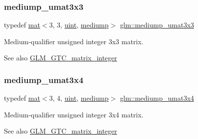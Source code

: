 \subsubsection{\texorpdfstring{mediump\+\_\+umat3x3}{mediump\_umat3x3}}
{\footnotesize\ttfamily typedef \mbox{\hyperlink{structglm_1_1mat}{mat}}$<$3, 3, \mbox{\hyperlink{group__core__precision_ga4fd29415871152bfb5abd588334147c8}{uint}}, \mbox{\hyperlink{namespaceglm_a36ed105b07c7746804d7fdc7cc90ff25a6416f3ea0c9025fb21ed50c4d6620482}{mediump}}$>$ \mbox{\hyperlink{group__gtc__matrix__integer_gac2563a9d45e3f6be0ceaf62b50a983f5}{glm\+::mediump\+\_\+umat3x3}}}

Medium-\/qualifier unsigned integer 3x3 matrix. \begin{DoxySeeAlso}{See also}
\mbox{\hyperlink{group__gtc__matrix__integer}{G\+L\+M\+\_\+\+G\+T\+C\+\_\+matrix\+\_\+integer}} 
\end{DoxySeeAlso}
\mbox{\label{group__gtc__matrix__integer_ga22e32b4dcd60655044ebbd30f50a2e67}} 
\subsubsection{\texorpdfstring{mediump\+\_\+umat3x4}{mediump\_umat3x4}}
{\footnotesize\ttfamily typedef \mbox{\hyperlink{structglm_1_1mat}{mat}}$<$3, 4, \mbox{\hyperlink{group__core__precision_ga4fd29415871152bfb5abd588334147c8}{uint}}, \mbox{\hyperlink{namespaceglm_a36ed105b07c7746804d7fdc7cc90ff25a6416f3ea0c9025fb21ed50c4d6620482}{mediump}}$>$ \mbox{\hyperlink{group__gtc__matrix__integer_ga22e32b4dcd60655044ebbd30f50a2e67}{glm\+::mediump\+\_\+umat3x4}}}

Medium-\/qualifier unsigned integer 3x4 matrix. \begin{DoxySeeAlso}{See also}
\mbox{\hyperlink{group__gtc__matrix__integer}{G\+L\+M\+\_\+\+G\+T\+C\+\_\+matrix\+\_\+integer}} 
\end{DoxySeeAlso}
\mbox{\label{group__gtc__matrix__integer_ga0653e9571754f1e33203290aaf3dfc5d}} 
